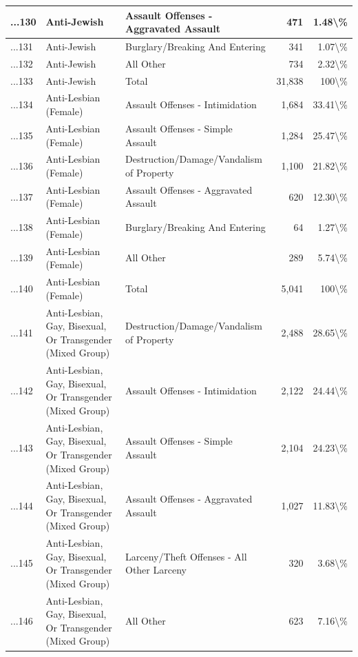 \documentclass[
]{krantz}
\begin{document}
\begin{longtable}[t]{l|l|l|r|r}
\hline
...130 & Anti-Jewish & Assault Offenses - Aggravated Assault & 471 & 1.48\textbackslash{}\%\\
\hline
...131 & Anti-Jewish & Burglary/Breaking And Entering & 341 & 1.07\textbackslash{}\%\\
\hline
...132 & Anti-Jewish & All Other & 734 & 2.32\textbackslash{}\%\\
\hline
...133 & Anti-Jewish & Total & 31,838 & 100\textbackslash{}\%\\
\hline
...134 & Anti-Lesbian (Female) & Assault Offenses - Intimidation & 1,684 & 33.41\textbackslash{}\%\\
\hline
...135 & Anti-Lesbian (Female) & Assault Offenses - Simple Assault & 1,284 & 25.47\textbackslash{}\%\\
\hline
...136 & Anti-Lesbian (Female) & Destruction/Damage/Vandalism of Property & 1,100 & 21.82\textbackslash{}\%\\
\hline
...137 & Anti-Lesbian (Female) & Assault Offenses - Aggravated Assault & 620 & 12.30\textbackslash{}\%\\
\hline
...138 & Anti-Lesbian (Female) & Burglary/Breaking And Entering & 64 & 1.27\textbackslash{}\%\\
\hline
...139 & Anti-Lesbian (Female) & All Other & 289 & 5.74\textbackslash{}\%\\
\hline
...140 & Anti-Lesbian (Female) & Total & 5,041 & 100\textbackslash{}\%\\
\hline
...141 & Anti-Lesbian, Gay, Bisexual, Or Transgender (Mixed Group) & Destruction/Damage/Vandalism of Property & 2,488 & 28.65\textbackslash{}\%\\
\hline
...142 & Anti-Lesbian, Gay, Bisexual, Or Transgender (Mixed Group) & Assault Offenses - Intimidation & 2,122 & 24.44\textbackslash{}\%\\
\hline
...143 & Anti-Lesbian, Gay, Bisexual, Or Transgender (Mixed Group) & Assault Offenses - Simple Assault & 2,104 & 24.23\textbackslash{}\%\\
\hline
...144 & Anti-Lesbian, Gay, Bisexual, Or Transgender (Mixed Group) & Assault Offenses - Aggravated Assault & 1,027 & 11.83\textbackslash{}\%\\
\hline
...145 & Anti-Lesbian, Gay, Bisexual, Or Transgender (Mixed Group) & Larceny/Theft Offenses - All Other Larceny & 320 & 3.68\textbackslash{}\%\\
\hline
...146 & Anti-Lesbian, Gay, Bisexual, Or Transgender (Mixed Group) & All Other & 623 & 7.16\textbackslash{}\%\\
\hline

\end{longtable}
\end{document}
